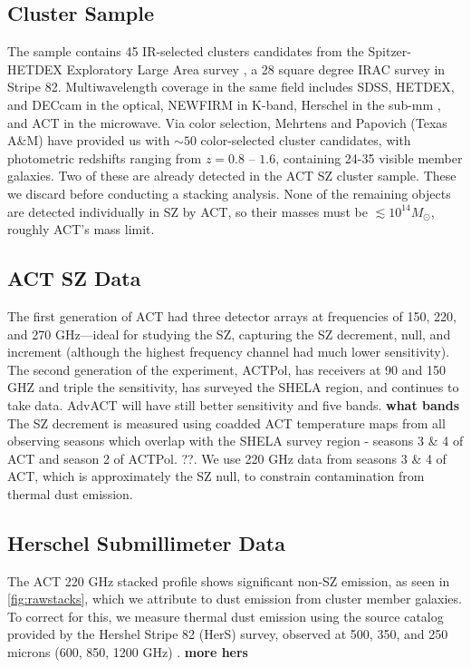 \documentclass[twocolumn,iop]{emulateapj}
\begin{document}
\subsection{Cluster Sample}
The sample contains 45 IR-selected clusters candidates from the Spitzer-HETDEX Exploratory Large Area survey \citep[SHELA,][]{2011sptz.prop80100P}, 
a 28 square degree IRAC survey in Stripe 82.  Multiwavelength coverage in the same field includes SDSS, HETDEX, and DECcam in the optical, NEWFIRM in K-band, Herschel in the sub-mm \citep[Herschel Stripe 82 Survey: HerS,][]{2014ApJS..210...22V}, and ACT in the microwave.  Via color selection, Mehrtens and Papovich (Texas A\&M) have provided us with $\sim 50$ color-selected cluster candidates, with photometric redshifts ranging from $z= 0.8$ -- $1.6$, containing 24-35 visible member galaxies. Two of these are already detected in the ACT SZ cluster sample. \citep{2013JCAP...07..008H}  These we discard before conducting a stacking analysis. None of the remaining objects are detected individually in SZ by ACT, so their masses must be $\lesssim 10^{14} M_\odot$, roughly ACT's mass limit.


\subsection{ACT SZ Data} 
The first generation of ACT had three detector arrays at frequencies of 150, 220, and 270 GHz---ideal for studying the SZ, capturing the SZ decrement, null, and increment (although the highest frequency channel had much lower sensitivity). The second generation of the experiment, ACTPol, has receivers at 90 and 150 GHZ and triple the sensitivity, has surveyed the SHELA region, and continues to take data.  AdvACT will have still better sensitivity and five bands. \textbf{what bands}
The SZ decrement is measured using coadded ACT temperature maps from all observing seasons which overlap with the SHELA survey region - seasons 3 \& 4 of ACT and season 2 of ACTPol. \citep{2011ApJS..194...41S}??. We use 220 GHz data from seasons 3 \& 4 of ACT, which is approximately the SZ null, to constrain contamination from thermal dust emission.


\subsection{Herschel Submillimeter Data}
The ACT 220 GHz stacked profile shows significant non-SZ emission, as seen in \ref{fig:rawstacks}, which we attribute to dust emission from cluster member galaxies. To correct for this, we measure thermal dust emission using the source catalog provided by the Hershel Stripe 82 (HerS) survey, observed at 500, 350, and 250 microns (600, 850, 1200 GHz) \citep{2014ApJS..210...22V}.
\textbf{more hers}
\end{document}
